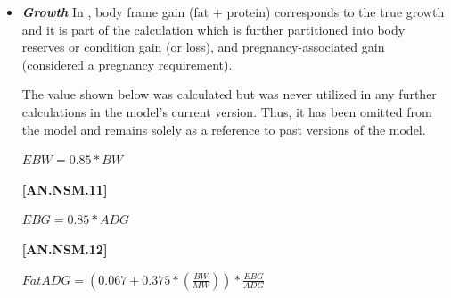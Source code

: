 \begin{refsection}
\begin{itemize}
\begin{center}
    \(NEa3 = 0.0067 * \frac{(EnvTopoParlor)}{1000} * BW\) 
\end{center}
\vspace{0.5cm}
            {\raggedleft \textbf{[AN.NSM.9]}\par}
            \vspace{0.2cm}
            
\begin{center}
    \(NEa = NEa1 + NEa2 + NEa3\) 
\end{center}
\vspace{0.5cm}

            {\raggedleft \textbf{[AN.NSM.10]}\par}
            \vspace{0.2cm}     

        \item \textbf{\textit {Growth}} In \textcite{nrc2021}, body frame gain (fat + protein) corresponds to the true growth and it is part of the calculation which is further partitioned into body reserves or condition gain (or loss), and pregnancy-associated gain (considered a pregnancy requirement). 
        \vspace{0.15cm}

        The value shown below was calculated but was never utilized in any further calculations in the model’s current version. Thus, it has been omitted from the model and remains solely as a reference to past versions of the model.
\vspace{0.5cm}

\begin{center}
    \(EBW = 0.85 * BW\) 
\end{center}
\vspace{0.5cm}

            {\raggedleft \textbf{[AN.NSM.11]}\par}
            \vspace{0.2cm} 
            
\begin{center}
    \(EBG = 0.85 * ADG\) 
\end{center}
\vspace{0.5cm}

            {\raggedleft \textbf{[AN.NSM.12]}\par}
            \vspace{0.2cm} 

\begin{center}
    \(FatADG = (0.067 + 0.375 * (\frac{BW}{MW})) * \frac{EBG}{ADG}\) 
\end{center}
\vspace{0.5cm}


\end{itemize}
\end{refsection}
